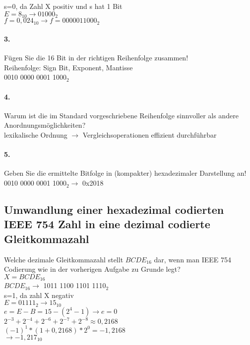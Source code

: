 \documentclass[paper=a4, fontsize=11pt]{scrartcl}
\numberwithin{equation}{section}
\numberwithin{figure}{section}
\numberwithin{table}{section}
\begin{document}
s=0, da Zahl X positiv und s hat 1 Bit \\

$E = 8_{10} \rightarrow 01000_{2}$ \\

$f = 0,024_{10} \rightarrow f=0000 0110 00_{2}$

\paragraph{3.}
Fügen Sie die 16 Bit in der richtigen Reihenfolge zusammen! \\

Reihenfolge: Sign Bit, Exponent, Mantisse \\
0010 0000 0001 100$0_{2}$

\paragraph{4.}
Warum ist die im Standard vorgeschriebene Reihenfolge sinnvoller als andere Anordnungsmöglichkeiten? \\

lexikalische Ordnung $\rightarrow$ Vergleichsoperationen effizient durchführbar

\paragraph{5.}
Geben Sie die ermittelte Bitfolge in (kompakter) hexadezimaler Darstellung an! \\
0010 0000 0001 100$0_{2} \rightarrow$ 0x2018


\subsection{Umwandlung einer hexadezimal codierten IEEE 754 Zahl in eine dezimal codierte Gleitkommazahl}

Welche dezimale Gleitkommazahl stellt $BCDE_{16}$ dar, wenn man IEEE 754 Codierung wie in der vorherigen Aufgabe zu Grunde legt? \\

$X=BCDE_{16}$ \\
$BCDE_{16} \rightarrow$ 1011 1100 1101 111$0_{2}$ \\
s=1, da zahl X negativ\\
$E= 01111_{2} \rightarrow 15_{10}$ \\
$e=E-B=15-(2^{4}-1) \rightarrow e=0$ \\
$2^{-3}+2^{-4}+2^{-6}+2^{-7}+2^{-8} \approx 0,2168$ \\
$(-1)^{1}*(1+ 0,2168)*2^{0} = -1,2168$ \\
$ \rightarrow -1,217_{10}$
\end{document}
